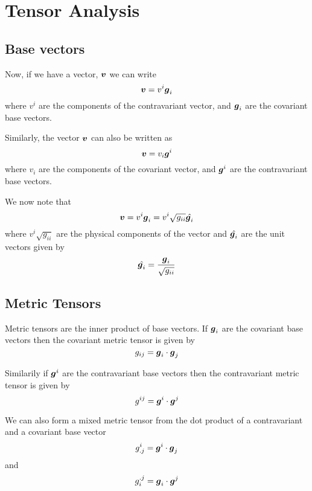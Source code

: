 \section{Tensor Analysis}
\subsection{Base vectors}

Now, if we have a vector, $\vect{v}$ we can write
\begin{equation}
  \vect{v}=v^{i}\vect{g}_{i}
\end{equation}
where $v^{i}$ are the components of the contravariant vector, and
$\vect{g}_{i}$ are the covariant base vectors.

Similarly, the vector $\vect{v}$ can also be written as 
\begin{equation}
  \vect{v}=v_{i}\vect{g}^{i}
\end{equation}
where $v_{i}$ are the components of the covariant vector, and
$\vect{g}^{i}$ are the contravariant base vectors. 

We now note that
\begin{equation}
  \vect{v}=v^{i}\vect{g}_{i}=v^{i}\sqrt{g_{ii}}\hat{\vect{g}_{i}}
\end{equation}
where $v^{i}\sqrt{g_{ii}}$ are the physical components of the vector and
$\hat{\vect{g}_{i}}$ are the unit vectors given by
\begin{equation}
  \hat{\vect{g}_{i}}=\dfrac{\vect{g}_{i}}{\sqrt{g_{ii}}}
\end{equation}

\subsection{Metric Tensors}

Metric tensors are the inner product of base vectors. If $\vect{g}_{i}$ are the
covariant base vectors then the covariant metric tensor is given by
\begin{equation}
  g_{ij}=\dotprod{\vect{g}_{i}}{\vect{g}_{j}}
\end{equation}

Similarily if $\vect{g}^{i}$ are the contravariant base vectors then the
contravariant metric tensor is given by 
\begin{equation}
  g^{ij}=\dotprod{\vect{g}^{i}}{\vect{g}^{j}}
\end{equation}

We can also form a mixed metric tensor from the dot product of a contravariant
and a covariant base vector \ie
\begin{equation}
  g^{i}_{.j}=\dotprod{\vect{g}^{i}}{\vect{g}_{j}}
\end{equation}
and 
\begin{equation}
  g_{i}^{.j}=\dotprod{\vect{g}_{i}}{\vect{g}^{j}}
\end{equation}

